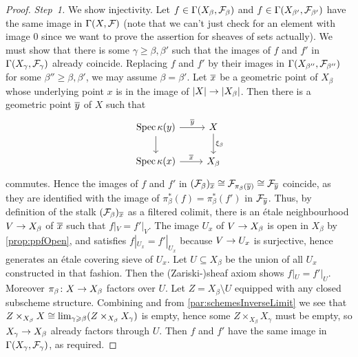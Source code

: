 \begin{proof}
	\emph{Step~1.} We show injectivity. Let $f\in\operatorname{\Gamma}(X_\beta,\mathcal{F}_\beta)$ and $f\in \operatorname{\Gamma}(X_{\beta'},\mathcal{F}_{\beta'})$ have the same image in $\operatorname{\Gamma}(X,\mathcal{F})$ (note that we can't just check for an element with image $0$ since we want to prove the assertion for sheaves of sets actually). We must show that there is some $\gamma\geq \beta,\beta'$ such that the images of $f$ and $f'$ in $\operatorname{\Gamma}(X_\gamma,\mathcal{F}_\gamma)$ already coincide. Replacing $f$ and $f'$ by their images in $\operatorname{\Gamma}(X_{\beta''},\mathcal{F}_{\beta''})$ for some $\beta''\geq \beta,\beta'$, we may assume $\beta=\beta'$. Let $\ov{x}$ be a geometric point of $X_\beta$ whose underlying point $x$ is in the image of $|X|\morphism |X_\beta|$. Then there is a geometric point $\ov{y}$ of $X$ such that
	\begin{equation*}
		\begin{tikzcd}
			\Spec \kappa(y)\dar\rar["\ov{y}"] & X\dar["\xi_\beta"]\\
			\Spec \kappa(x) \rar["\ov{x}"] & X_\beta
		\end{tikzcd} 
	\end{equation*}
	commutes. Hence the images of $f$ and $f'$ in $(\Ff_\beta)_{\ov{x}}\cong \Ff_{\pi_\beta(\ov{y})}\cong \Ff_{\ov{y}}$ coincide, as they are identified with the image of $\pi_\beta^*(f)=\pi_\beta^*(f')$ in $\Ff_{\ov{y}}$. Thus, by definition of the stalk $(\Ff_\beta)_{\ov{x}}$ as a filtered colimit, there is an étale neighbourhood $V\morphism X_\beta$ of $\ov{x}$ such that $f|_V=f'|_V$. The image $U_x$ of $V\morphism X_\beta$ is open in $X_\beta$ by \cref{prop:ppfOpen}, and satisfies $f|_{U_x}=f'|_{U_x}$ because $V\morphism U_x$ is surjective, hence generates an étale covering sieve of $U_x$. Let $U\subseteq X_\beta$ be the union of all $U_x$ constructed in that fashion. Then the (Zariski-)sheaf axiom shows $f|_U=f'|_U$. Moreover $\pi_\beta\colon X\morphism X_\beta$ factors over $U$. Let $Z=X_\beta\setminus U$ equipped with any closed subscheme structure. Combining  and  from \cref{par:schemesInverseLimit} we see that $Z\times_{X_\beta}X\cong \operatorname*{lim}_{\gamma\geqslant \beta} (Z\times_{X_\beta}X_\gamma)$ is empty, hence some $Z\times_{X_\beta}X_\gamma$ must be empty, so $X_\gamma\morphism X_\beta$ already factors through $U$. Then $f$ and $f'$ have the same image in $\operatorname{\Gamma}(X_\gamma,\mathcal{F}_\gamma)$, as required.
	

\end{proof}
